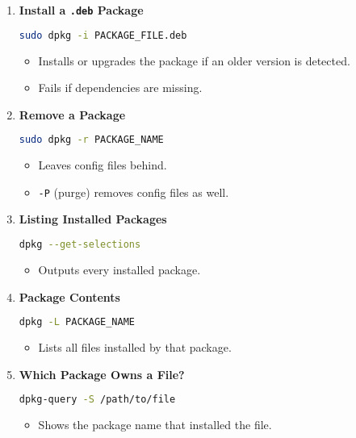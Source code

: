 \documentclass[12pt,a4paper]{report}
\begin{document}
\begin{enumerate}
    \item \textbf{Install a \texttt{.deb} Package}
    \begin{lstlisting}[language=bash]
sudo dpkg -i PACKAGE_FILE.deb
    \end{lstlisting}
    \begin{itemize}
        \item Installs or upgrades the package if an older version is detected.
        \item Fails if dependencies are missing.
    \end{itemize}

    \item \textbf{Remove a Package}
    \begin{lstlisting}[language=bash]
sudo dpkg -r PACKAGE_NAME
    \end{lstlisting}
    \begin{itemize}
        \item Leaves config files behind.
        \item \texttt{-P} (purge) removes config files as well.
    \end{itemize}

    \item \textbf{Listing Installed Packages}
    \begin{lstlisting}[language=bash]
dpkg --get-selections
    \end{lstlisting}
    \begin{itemize}
        \item Outputs every installed package.
    \end{itemize}

    \item \textbf{Package Contents}
    \begin{lstlisting}[language=bash]
dpkg -L PACKAGE_NAME
    \end{lstlisting}
    \begin{itemize}
        \item Lists all files installed by that package.
    \end{itemize}

    \item \textbf{Which Package Owns a File?}
    \begin{lstlisting}[language=bash]
dpkg-query -S /path/to/file
    \end{lstlisting}
    \begin{itemize}
        \item Shows the package name that installed the file.
    \end{itemize}


\end{enumerate}
\end{document}
